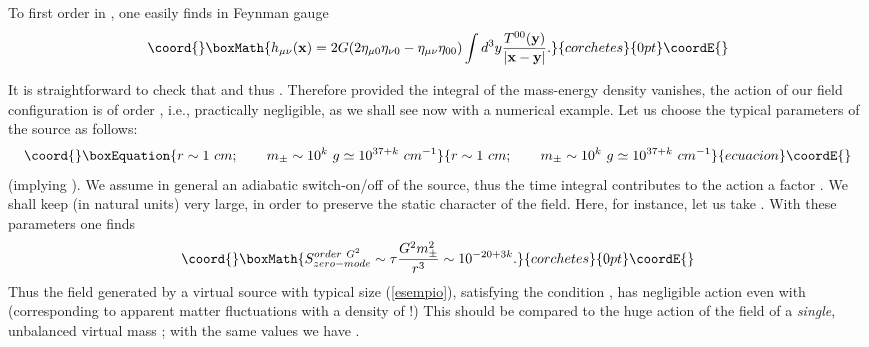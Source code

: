 \documentclass[a4paper,11pt]{article}
\begin{document}
To first order in \coordHE{}, one easily finds in Feynman gauge
	\begin{displaymath}\coord{}\boxMath{
	h_{\mu \nu}({\bf x})  
	= 2G (2\eta_{\mu 0} 
	\eta_{\nu 0} - \eta_{\mu \nu} \eta_{00})
	\int d^3y 
	\frac{T^{00}({\bf y})}{|{\bf x}-{\bf y}|}.
}{corchetes}{0pt}\coordE{}\end{displaymath}

It is straightforward to check that
\coordHE{} and thus
\coordHE{}.
Therefore provided the integral of the mass-energy density
vanishes, the action of our field configuration is of
order \coordHE{}, i.e., practically negligible, as we shall 
see now with a numerical example. Let us choose 
the typical parameters of the source as follows:
	\begin{equation}\coord{}\boxEquation{
	r \sim 1 \ cm; \qquad 
	m_\pm \sim 10^k \ g \simeq 10^{37+k} \ cm^{-1}
\label{esempio}
}{
	r \sim 1 \ cm; \qquad 
	m_\pm \sim 10^k \ g \simeq 10^{37+k} \ cm^{-1}
}{ecuacion}\coordE{}\end{equation}
	(implying \coordHE{}). 
We assume in general an adiabatic switch-on/off of the
source, thus the time integral contributes to the action
a factor \myHighlight{$\tau$}\coordHE{}. We shall keep \myHighlight{$\tau$}\coordHE{} (in natural units)
very large, in order to preserve the static character 
of the field. Here, for instance, let us take
\coordHE{}.
With these parameters one finds
	\begin{displaymath}\coord{}\boxMath{
	S_{zero-mode}^{order \ G^2} 
	\sim \tau \frac{G^2 m_\pm^2}{r^3}
	\sim 10^{-20+3k}.
}{corchetes}{0pt}\coordE{}\end{displaymath}  
	Thus the field generated by a virtual source 
with typical size (\ref{esempio}), satisfying the condition
\coordHE{}, has negligible action
even with \coordHE{} (corresponding to apparent matter 
fluctuations with a density of \coordHE{} !) 
This should be compared to the huge action of the field
of a {\it single}, unbalanced virtual mass \coordHE{}; with 
the same values we have
\coordHE{}.
\end{document}
